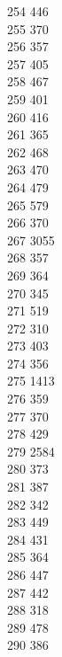 { 254	446 \\
 255	370 \\
 256	357 \\
 257	405 \\
 258	467 \\
 259	401 \\
 260	416 \\
 261	365 \\
 262	468 \\
 263	470 \\
 264	479 \\
 265	579 \\
 266	370 \\
 267	3055 \\
 268	357 \\
 269	364 \\
 270	345 \\
 271	519 \\
 272	310 \\
 273	403 \\
 274	356 \\
 275	1413 \\
 276	359 \\
 277	370 \\
 278	429 \\
 279	2584 \\
 280	373 \\
 281	387 \\
 282	342 \\
 283	449 \\
 284	431 \\
 285	364 \\
 286	447 \\
 287	442 \\
 288	318 \\
 289	478 \\
 290	386 \\
}
